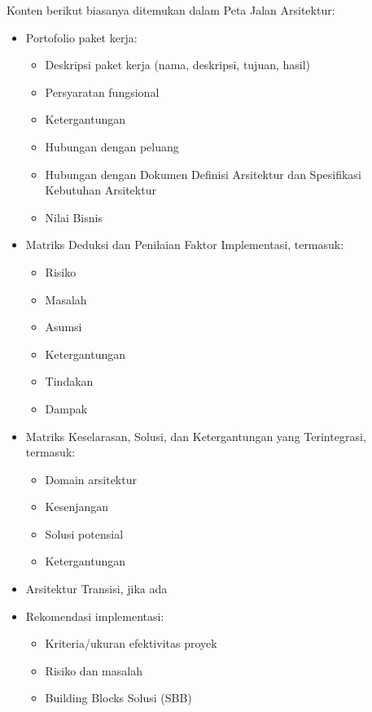 Konten berikut biasanya ditemukan dalam Peta Jalan Arsitektur:
\begin{itemize}
	\item Portofolio paket kerja:
	\begin{itemize}
		\item Deskripsi paket kerja (nama, deskripsi, tujuan, hasil)
		\item Persyaratan fungsional
		\item Ketergantungan
		\item Hubungan dengan peluang
		\item Hubungan dengan Dokumen Definisi Arsitektur dan Spesifikasi Kebutuhan Arsitektur
		\item Nilai Bisnis
	\end{itemize}
	\item Matriks Deduksi dan Penilaian Faktor Implementasi, termasuk:
	\begin{itemize}
		\item Risiko
		\item Masalah
		\item Asumsi
		\item Ketergantungan
		\item Tindakan
		\item Dampak
	\end{itemize}
	\item Matriks Keselarasan, Solusi, dan Ketergantungan yang Terintegrasi, termasuk:
	\begin{itemize}
		\item Domain arsitektur
		\item Kesenjangan
		\item Solusi potensial
		\item Ketergantungan
	\end{itemize}
	\item Arsitektur Transisi, jika ada
	\item Rekomendasi implementasi:
	\begin{itemize}
		\item Kriteria/ukuran efektivitas proyek
		\item Risiko dan masalah
		\item Building Blocks Solusi (SBB)
	\end{itemize}
\end{itemize}


